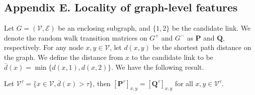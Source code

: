 \documentclass[11pt]{article}
\begin{document}
\subsection*{Appendix E. Locality of graph-level features}
Let $G=(\mathcal{V},\mathcal{E})$ be an enclosing subgraph, and $\{1,2\}$ be the candidate link. 
We denote the random walk transition matrices on $G^+$ and $G^-$ as $\mathbf{P}$ and $\mathbf{Q}$, respectively. For any node $x,y\in \mathcal{V}$, let $d(x,y)$ be the shortest path distance on the graph. We define the distance from $x$ to the candidate link to be $\bar{d}(x)=\min \{d(x,1),d(x,2)\}$. We have the following result.
\begin{proposition}
Let $\mathcal{V}^{\tau}=\{x\in\mathcal{V}, \bar{d}(x)>\tau\}$, then $[\mathbf{P}^{\tau}]_{x,y}=[\mathbf{Q}^{\tau}]_{x,y}$ for all $x,y\in \mathcal{V}^{\tau}$.
\end{proposition}
\end{document}
